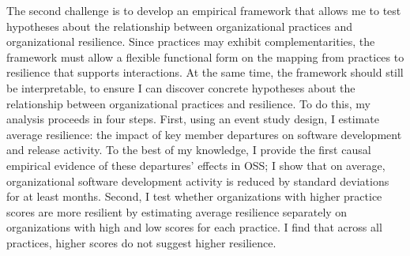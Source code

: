\documentclass[12pt,notitlepage]{article}
\begin{document}


The second challenge is to develop an empirical framework that allows me to test hypotheses about the relationship between organizational practices and organizational resilience.
Since practices may exhibit complementarities, the framework must allow a flexible functional form on the mapping from practices to resilience that supports interactions.
At the same time, the framework should still be interpretable, to ensure I can discover concrete hypotheses about the relationship between organizational practices and resilience.
To do this, my analysis proceeds in four steps. 
First, using an event study design, I estimate average resilience: the impact of key member departures on software development and release activity. 
To the best of my knowledge, I provide the first causal empirical evidence of these departures' effects in OSS; I show that on average, organizational software development activity is reduced by \AvgMaxDecline{} standard deviations for at least \NumMonthsObserved{} months.
Second, I test whether organizations with higher practice scores are more resilient by estimating average resilience separately on organizations with high and low scores for each practice. 
I find that across all practices, higher scores do not suggest higher resilience. 
\end{document}
